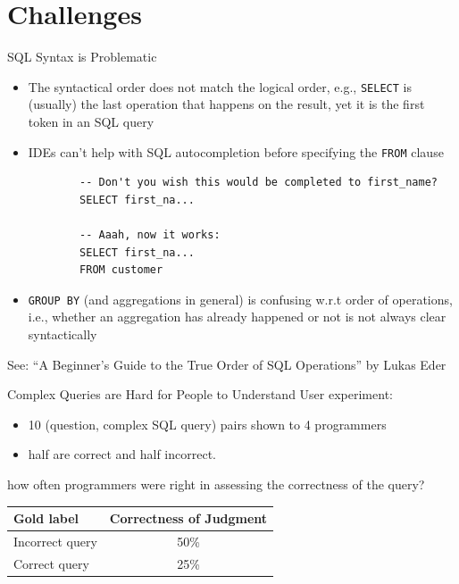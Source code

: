 \documentclass{beamer}
\begin{document}
\section{Challenges}

\begin{frame}[fragile]{SQL Syntax is Problematic}
    \begin{itemize}
        \item The \alert{syntactical} order does not match the \alert{logical} order, e.g., \texttt{SELECT} is (usually) the last operation that happens on the result, yet it is the first token in an SQL query

        \item IDEs can't help with SQL autocompletion before specifying the \texttt{FROM} clause

        \begin{verbatim}
        -- Don't you wish this would be completed to first_name?
        SELECT first_na...
 
        -- Aaah, now it works:
        SELECT first_na...
        FROM customer
        \end{verbatim}
        
        \item \texttt{GROUP BY} (and aggregations in general) is confusing w.r.t order of operations, i.e., whether an aggregation has already happened or not is not always clear \alert{syntactically}
    \end{itemize}

    \vfill

    \tiny{See: ``A Beginner's Guide to the True Order of SQL Operations'' by Lukas Eder}
\end{frame}

\begin{frame}{Complex Queries are Hard for People to Understand}
    User experiment: 
    \begin{itemize}
        \item 10 (question, complex SQL query) pairs shown to 4 programmers
        \item half are correct and half incorrect. 
    \end{itemize}
    
    how often programmers were right in assessing the correctness of the query?
    
    \begin{table}[h]
    \centering
    \begin{tabular}{lc}
        \toprule
        \textbf{Gold label} & \textbf{Correctness of Judgment} \\
        \midrule
        Incorrect query & 50\% \\
        Correct query   & 25\% \\
        \bottomrule
    \end{tabular}
    \end{table}
\end{frame}
\end{document}
